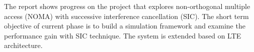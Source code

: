 The report shows progress on the project that explores non-orthogonal
multiple access (NOMA) with successive interference cancellation (SIC).
The short term objective of current phase is to build a simulation
framework and examine the performance gain with SIC technique. The
system is extended based on LTE architecture.



